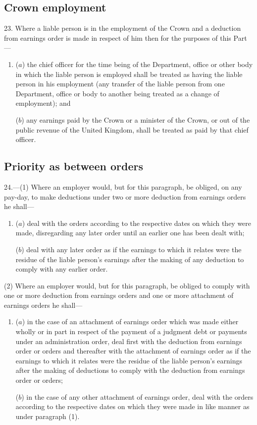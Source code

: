 \documentclass[12pt,a4paper]{article}
\begin{document}
\subsection[23. Crown employment]{Crown employment}

23.  Where a liable person is in the employment of the Crown and a deduction from earnings order is made in respect of him then for the purposes of this Part—
\begin{enumerate}\item[]
($a$) the chief officer for the time being of the Department, office or other body in which the liable person is employed shall be treated as having the liable person in his employment (any transfer of the liable person from one Department, office or body to another being treated as a change of employment); and

($b$) any earnings paid by the Crown or a minister of the Crown, or out of the public revenue of the United Kingdom, shall be treated as paid by that chief officer.
\end{enumerate}

\subsection[24. Priority as between orders]{Priority as between orders}

24.—(1) Where an employer would, but for this paragraph, be obliged, on any pay-day, to make deductions under two or more deduction from earnings orders he shall—
\begin{enumerate}\item[]
($a$) deal with the orders according to the respective dates on which they were made, disregarding any later order until an earlier one has been dealt with;

($b$) deal with any later order as if the earnings to which it relates were the residue of the liable person’s earnings after the making of any deduction to comply with any earlier order.
\end{enumerate}

(2) Where an employer would, but for this paragraph, be obliged to comply with one or more deduction from earnings orders and one or more attachment of earnings orders he shall—
\begin{enumerate}\item[]
($a$) in the case of an attachment of earnings order which was made either wholly or in part in respect of the payment of a judgment debt or payments under an administration order, deal first with the deduction from earnings order or orders and thereafter with the attachment of earnings order as if the earnings to which it relates were the residue of the liable person’s earnings after the making of deductions to comply with the deduction from earnings order or orders;

($b$) in the case of any other attachment of earnings order, deal with the orders according to the respective dates on which they were made in like manner as under paragraph (1).
\end{enumerate}
\end{document}

